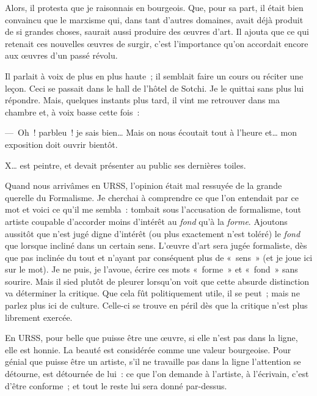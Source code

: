 \documentclass[french,twoside]{book} %
\newcommand{\astermono}{\medskip\centerline{\color{rubric}\large\selectfont{\syms ✻}}\medskip\par}%
\begin{document}
Alors, il protesta que je raisonnais en bourgeois. Que, pour sa part, il était bien convaincu que le marxisme qui, dans tant d’autres domaines, avait déjà produit de si grandes choses, saurait aussi produire des œuvres d’art. Il ajouta que ce qui retenait ces nouvelles œuvres de surgir, c’est l’importance qu’on accordait encore aux œuvres d’un passé révolu.\par
Il parlait à voix de plus en plus haute ; il semblait faire un cours ou réciter une leçon. Ceci se passait dans le hall de l’hôtel de Sotchi. Je le quittai sans plus lui répondre. Mais, quelques instants plus tard, il vint me retrouver dans ma chambre et, à voix basse cette fois :\par
— Oh ! parbleu ! je sais bien… Mais on nous écoutait tout à l’heure et… mon exposition doit ouvrir bientôt.\par
X… est peintre, et devait présenter au public ses dernières toiles.\par

\astermono

\noindent Quand nous arrivâmes en URSS, l’opinion était mal ressuyée de la grande querelle du Formalisme. Je cherchai à comprendre ce que l’on entendait par ce mot et voici ce qu’il me sembla : tombait sous l’accusation de formalisme, tout artiste coupable d’accorder moins d’intérêt au \emph{fond} qu’à la \emph{forme}. Ajoutons aussitôt que n’est jugé digne d’intérêt (ou plus exactement n’est toléré) le \emph{fond} que lorsque incliné dans un certain sens. L’œuvre d’art sera jugée formaliste, dès que pas inclinée du tout et n’ayant par conséquent plus de « sens » (et je joue ici sur le mot). Je ne puis, je l’avoue, écrire ces mots « forme » et « fond » sans sourire. Mais il sied plutôt de pleurer lorsqu’on voit que cette absurde distinction va déterminer la critique. Que cela fût politiquement utile, il se peut ; mais ne parlez plus ici de culture. Celle-ci se trouve en péril dès que la critique n’est plus librement exercée.\par
En URSS, pour belle que puisse être une œuvre, si elle n’est pas dans la ligne, elle est honnie. La beauté est considérée comme une valeur bourgeoise. Pour génial que puisse être un artiste, s’il ne travaille pas dans la ligne l’attention se détourne, est détournée de lui : ce que l’on demande à l’artiste, à l’écrivain, c’est d’être conforme ; et tout le reste lui sera donné par-dessus.\par

\astermono
\end{document}
